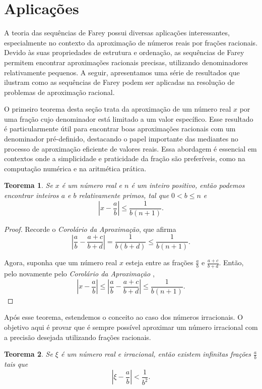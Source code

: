 \documentclass{hipatia}
\newtheorem*{theorem*}{Teorema}
\theoremstyle{definition} %
\begin{document}
\section{Aplicações}

A teoria das sequências de Farey possui diversas aplicações interessantes, especialmente no contexto da aproximação de números reais por frações racionais. Devido às suas propriedades de estrutura e ordenação, as sequências de Farey permitem encontrar aproximações racionais precisas, utilizando denominadores relativamente pequenos. A seguir, apresentamos uma série de resultados que ilustram como as sequências de Farey podem ser aplicadas na resolução de problemas de aproximação racional.

O primeiro teorema desta seção trata da aproximação de um número real $x$ por uma fração cujo denominador está limitado a um valor específico. Esse resultado é particularmente útil para encontrar boas aproximações racionais com um denominador pré-definido, destacando o papel importante das mediantes no processo de aproximação eficiente de valores reais. Essa abordagem é essencial em contextos onde a simplicidade e praticidade da fração são preferíveis, como na computação numérica e na aritmética prática.


\begin{theorem*}
Se \(x\) é um número real e \(n\) é um inteiro positivo, então podemos encontrar inteiros \(a\) e \(b\) relativamente primos, tal que \(0 < b \leq n\) e
\[
\left| x - \frac{a}{b} \right| \leq \frac{1}{b(n + 1)}.
\]
\end{theorem*}

\begin{proof}
Recorde o \textit{Corolário da Aproximação}, que afirma
\[
\left| \frac{a}{b} - \frac{a + c}{b + d} \right| = \frac{1}{b(b + d)} \leq \frac{1}{b(n + 1)}.
\]

Agora, suponha que um número real \(x\) esteja entre as frações \(\frac{a}{b}\) e \(\frac{a + c}{b + d}\). Então, pelo novamente pelo \textit{Corolário da Aproximação} ,
\[
\left| x - \frac{a}{b} \right| \leq \left| \frac{a}{b} - \frac{a + c}{b + d} \right| \leq \frac{1}{b(n + 1)}.
\]
\end{proof}

Após esse teorema, estendemos o conceito ao caso dos números irracionais. O objetivo aqui é provar que é sempre possível aproximar um número irracional com a precisão desejada utilizando frações racionais. 


\begin{theorem*}
Se \( \xi \) é um número real e irracional, então existem infinitas frações \( \frac{a}{b} \) tais que
\[
\left| \xi - \frac{a}{b} \right| < \frac{1}{b^2}.
\]
\end{theorem*}
\end{document}
